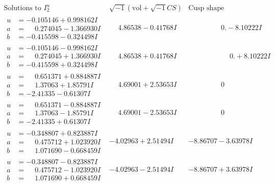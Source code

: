 \documentclass[1p]{elsarticle_modified}
\theoremstyle{definition}
\newcommand{\I}{\sqrt{-1}}
\begin{document}
$$\begin{array}{c|c|c}  
\text{Solutions to }I^u_{2}& \I (\text{vol} + \sqrt{-1}CS) & \text{Cusp shape}\\
 \hline 
\begin{aligned}
u &= -0.105146 + 0.998162 I \\
a &= \phantom{-}0.274045 - 1.366930 I \\
b &= -0.415598 - 0.324498 I\end{aligned}
 & \phantom{-}4.86538 - 0.41768 I & \phantom{-0.000000 } 0. - 8.10222 I \\ \hline\begin{aligned}
u &= -0.105146 - 0.998162 I \\
a &= \phantom{-}0.274045 + 1.366930 I \\
b &= -0.415598 + 0.324498 I\end{aligned}
 & \phantom{-}4.86538 + 0.41768 I & \phantom{-0.000000 -}0. + 8.10222 I \\ \hline\begin{aligned}
u &= \phantom{-}0.651371 + 0.884887 I \\
a &= \phantom{-}1.37063 + 1.85791 I \\
b &= -2.41335 - 0.61307 I\end{aligned}
 & \phantom{-}4.69001 + 2.53653 I & \phantom{-0.000000 } 0 \\ \hline\begin{aligned}
u &= \phantom{-}0.651371 - 0.884887 I \\
a &= \phantom{-}1.37063 - 1.85791 I \\
b &= -2.41335 + 0.61307 I\end{aligned}
 & \phantom{-}4.69001 - 2.53653 I & \phantom{-0.000000 } 0 \\ \hline\begin{aligned}
u &= -0.348807 + 0.823887 I \\
a &= \phantom{-}0.475712 + 1.023920 I \\
b &= \phantom{-}1.071690 - 0.668459 I\end{aligned}
 & -4.02963 + 2.51494 I & -8.86707 - 3.63978 I \\ \hline\begin{aligned}
u &= -0.348807 - 0.823887 I \\
a &= \phantom{-}0.475712 - 1.023920 I \\
b &= \phantom{-}1.071690 + 0.668459 I\end{aligned}
 & -4.02963 - 2.51494 I & -8.86707 + 3.63978 I \\ \hline\begin{aligned}

\end{aligned}
\end{array}$$
\end{document}
